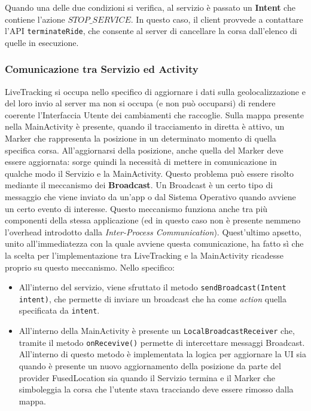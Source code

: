                             Quando una delle due condizioni si verifica, al servizio è passato un \textbf{Intent} che contiene l'azione \texttt{$STOP\_SERVICE$}. In questo caso, il client provvede a contattare l'API \texttt{terminateRide}, che consente al server di cancellare la corsa dall'elenco di quelle in esecuzione.
                        
                            \subsubsection{Comunicazione tra Servizio ed Activity}
                                LiveTracking si occupa nello specifico di aggiornare i dati sulla geolocalizzazione e del loro invio al server ma non si occupa (e non può occuparsi) di rendere coerente l'Interfaccia Utente dei cambiamenti che raccoglie. Sulla mappa presente nella MainActivity è presente, quando il tracciamento in diretta è attivo, un Marker che rappresenta la posizione in un determinato momento di quella specifica corsa. All'aggiornarsi della posizione, anche quella del Marker deve essere aggiornata: sorge quindi la necessità di mettere in comunicazione in qualche modo il Servizio e la MainActivity. Questo problema può essere risolto mediante il meccanismo dei \textbf{Broadcast}. Un Broadcast è un certo tipo di messaggio che viene inviato da un'app o dal Sistema Operativo quando avviene un certo evento di interesse. Questo meccanismo funziona anche tra più componenti della stessa applicazione (ed in questo caso non è presente nemmeno l'overhead introdotto dalla \textit{Inter-Process Communication}). Quest'ultimo apsetto, unito all'immediatezza con la quale avviene questa comunicazione, ha fatto sì che la scelta per l'implementazione tra LiveTracking e la MainActivity ricadesse proprio su questo meccanismo. Nello specifico: 
                                \begin{itemize}
                                    \item All'interno del servizio, viene sfruttato il metodo \texttt{sendBroadcast(Intent intent)}, che permette di inviare un broadcast che ha come \textit{action} quella specificata da \texttt{intent}.
                                    \item All'interno della MainActivity è presente un \texttt{LocalBroadcastReceiver} che, tramite il metodo \texttt{onRecevive()} permette di intercettare messaggi Broadcast. All'interno di questo metodo è implementata la logica per aggiornare la UI sia quando è presente un nuovo aggiornamento della posizione da parte del provider FusedLocation sia quando il Servizio termina e il Marker che simboleggia la corsa che l'utente stava tracciando deve essere rimosso dalla mappa.   
                                \end{itemize}
                        